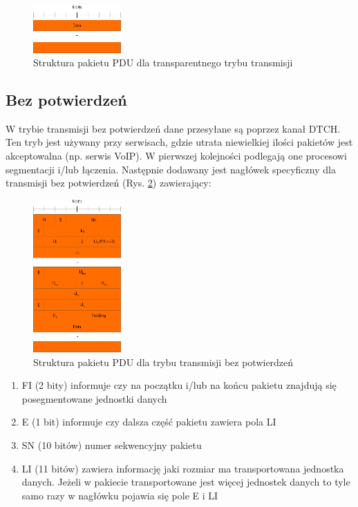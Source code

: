 \begin{figure}
	\centerline{\includegraphics[width=0.3\textwidth]{images/rlc_tm_pdu.png}}
	\caption{Struktura pakietu PDU dla transparentnego trybu transmisji}
	\label{fig:rlc_tm_pdu}
\end{figure}

\subsection{Bez potwierdzeń}
\label{subsec:um}

W trybie transmisji bez potwierdzeń dane przesyłane są poprzez kanał DTCH. Ten tryb jest używany przy serwisach, gdzie utrata niewielkiej ilości pakietów jest akceptowalna (np. serwis VoIP). W pierwszej kolejności podlegają one procesowi segmentacji i/lub łączenia. Następnie dodawany jest nagłówek specyficzny dla transmisji bez potwierdzeń (Rys. \ref{fig:rlc_um_pdu}) zawierający: 

\begin{figure}
	\centerline{\includegraphics[width=0.3\textwidth]{images/rlc_um_pdu.png}}
	\caption{Struktura pakietu PDU dla trybu transmisji bez potwierdzeń}
	\label{fig:rlc_um_pdu}
\end{figure}

\begin{enumerate}
	\item FI (2 bity) informuje czy na początku i/lub na końcu pakietu znajdują się posegmentowane jednostki danych	
	\item E (1 bit) informuje czy dalsza część pakietu zawiera pola LI
	\item SN (10 bitów) numer sekwencyjny pakietu
	\item LI (11 bitów) zawiera informację jaki rozmiar ma transportowana jednostka danych. Jeżeli w pakiecie transportowane jest więcej jednostek danych to tyle samo razy w nagłówku pojawia się pole E i LI
\end{enumerate}

